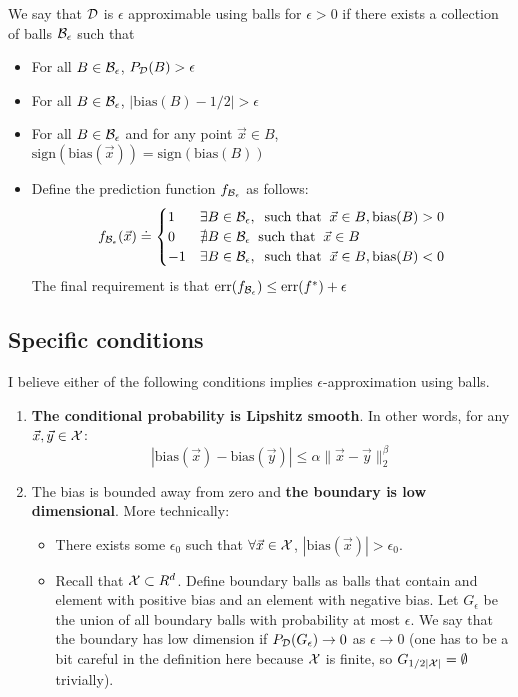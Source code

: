 \documentclass{article}
\newcommand{\err}{\mbox{err}}
\newcommand{\X}{{\cal X}}
\newcommand{\D}{{\cal D}}
\newcommand{\x}{\vec{x}}
\newcommand{\y}{\vec{y}}
\newcommand{\bias}{\text{bias}}
\newcommand{\sign}{\text{sign}}
\begin{document}
\newcommand{\Be}{{\cal B}_{\epsilon}}
\newcommand{\fBe}{f_{\Be}}
\newcommand{\UBe}{U_{\epsilon}}
We say that $\D$ is $\epsilon$ approximable using balls for $\epsilon>0$ if
there exists a collection of balls $\Be$ such that 
\begin{itemize}
\item For all $B \in \Be$, $P_{\D}(B)>\epsilon$
\item For all $B \in \Be$, $|\bias(B)-1/2| > \epsilon$
\item For all $B \in \Be$ and for any point $\x \in B$, $\sign(\bias(\x))=\sign(\bias(B))$
\item %
  Define the prediction function $\fBe$ as follows:
  \[
  \fBe(\x) \doteq \begin{cases}
    1 & \exists B \in \Be, \;\;\mbox{such that}\;\; \x \in B,
    \bias(B)>0 \\
    0 & \nexists B \in \Be \;\;\mbox{such that}\;\; \x \in B \\
    -1 & \exists B \in \Be, \;\;\mbox{such that}\;\; \x \in B,
    \bias(B)<0
  \end{cases}
  \]
  The final requirement is that $\err(\fBe) \leq \err(\Bayes)+\epsilon$
\end{itemize}

\subsection{Specific conditions}

I believe either of the following conditions implies
$\epsilon$-approximation using balls.

\begin{enumerate}
\item
  {\bf The conditional probability is Lipshitz smooth}. In other words, for
any $\x,\y \in \X$:
\[
|\bias(\x) - \bias(\y)| \leq \alpha \|\x-\y\|_2^{\beta}
\]
\item
The bias is bounded away from zero and {\bf the boundary is low
dimensional}. More technically:
\begin{itemize}
\item There exists some $\epsilon_0$ such that $\forall \x \in \X$, $|\bias(\x)|>\epsilon_0$.
\item Recall that $\X \subset R^d$. Define boundary balls as balls
  that contain and element with positive bias and an element with
  negative bias. Let $G_{\epsilon}$ be the union of all boundary balls
  with probability at most $\epsilon$. We say that the boundary has
  low dimension if $P_{\D}(G_{\epsilon}) \to 0$ as $\epsilon \to 0$
  (one has to be a bit careful in the definition here because $\X$ is finite, so
  $G_{1/2|\X|}=\emptyset$ trivially).  
\end{itemize}
\end{enumerate}
\end{document}
